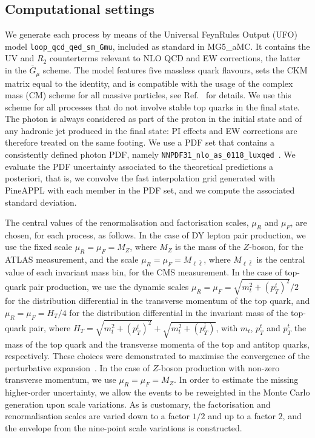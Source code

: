 \subsection{Computational settings}
\label{subsec:computational_settings}

We generate each process by means of the Universal FeynRules Output
(UFO)~\cite{Degrande:2011ua} model {\tt loop\_qcd\_qed\_sm\_Gmu},
included as standard in {\sc MG5\_aMC}. It contains the UV and $R_2$
counterterms relevant to NLO QCD and EW corrections, the latter in the
$\overline{G}_\mu$ scheme. The model features five massless quark flavours,
sets the CKM matrix equal to the identity, and is compatible with the usage of
the complex mass (CM) scheme for all massive particles, see
Ref.~\cite{Frederix:2018nkq} for details. We use this scheme
for all processes that do not involve stable top quarks in the final state.
The photon is always considered as part of the proton in the initial state and
of any hadronic jet produced in the final state: PI effects and EW corrections
are therefore treated on the same footing. We use a PDF set that contains a
consistently defined photon PDF, namely
{\tt NNPDF31\_nlo\_as\_0118\_luxqed}~\cite{Bertone:2017bme}. We evaluate the PDF
uncertainty associated to the theoretical predictions a posteriori, that is,
we convolve the fast interpolation grid generated with {\sc PineAPPL} with
each member in the PDF set, and we compute the associated standard deviation.

The central values of the renormalisation and factorisation scales, $\mu_R$ and
$\mu_F$, are chosen, for each process, as follows. In the case of DY lepton pair
production, we use the fixed scale $\mu_R=\mu_F=M_Z$, where $M_Z$ is the mass
of the $Z$-boson, for the ATLAS measurement, and the scale
$\mu_R=\mu_F=M_{\ell\bar\ell}$, where $M_{\ell\bar\ell}$ is the central value of each
invariant mass bin, for the CMS measurement.
In the case of top-quark pair production, we use the dynamic scales
$\mu_R=\mu_F=\sqrt{m_t^2+(p_T^t)^2}{\Big /}2$ for the distribution differential
in the transverse momentum of the top quark, and $\mu_R=\mu_F=H_T/4$ for the
distribution differential in the invariant mass of the top-quark pair, where
$H_T=\sqrt{m_t^2+(p_T^t)^2}+\sqrt{m_t^2+(p_T^{\bar{t}})}$, with $m_t$,
$p_T^t$ and $p_T^{\bar t}$ the mass of the top quark and the transverse momenta
of the top and antitop quarks, respectively. These choices were demonstrated
to maximise the convergence of the perturbative expansion~\cite{Czakon:2016dgf}.
In the case of $Z$-boson production with non-zero transverse momentum, we use
$\mu_R=\mu_F=M_Z$. In order to estimate the missing higher-order uncertainty,
we allow the events to be reweighted in the Monte Carlo generation upon scale
variations. As is customary, the factorisation and renormalisation scales
are varied down to a factor $1/2$ and up to a factor $2$, and the envelope
from the nine-point scale variations is constructed.

